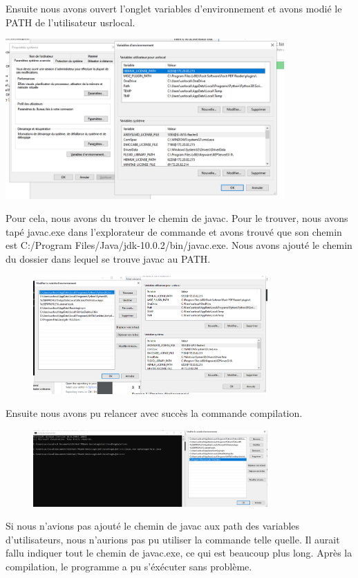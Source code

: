 \documentclass{article}
\begin{document}
Ensuite nous avons ouvert l'onglet variables d'environnement et avons modié le PATH de l'utilisateur usrlocal.

\includegraphics[width=0.8\textwidth]{Annotation 2023-01-10 143100.png}


Pour cela, nous avons du trouver le chemin de javac. Pour le trouver, nous avons tapé javac.exe dans l'explorateur de commande et avons trouvé que son chemin est C:/Program Files/Java/jdk-10.0.2/bin/javac.exe.
Nous avons ajouté le chemin du dossier dans lequel se trouve javac au PATH.


\begin{figure}[h]
\includegraphics[width=0.8\textwidth]{Annotation 2023-01-10 145746.png}
\end{figure}
Ensuite nous avons pu relancer avec succès la commande compilation.
\begin{figure}[h]
\includegraphics[width=0.8\textwidth]{Annotation 2023-01-10 145813.png}
\end{figure}

Si nous n'avions pas ajouté le chemin de javac aux path des variables d'utilisateurs, nous n'aurions pas pu utiliser la commande telle quelle. Il aurait fallu indiquer tout le chemin de javac.exe, ce qui est beaucoup plus long.
Après la compilation, le programme a pu s'éxécuter sans problème.
\end{document}

